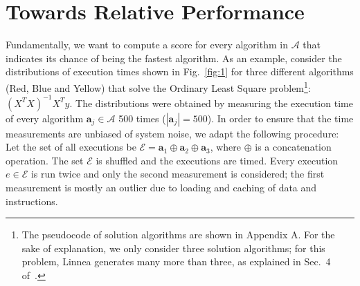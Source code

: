\documentclass[conference]{IEEEtran}
\newcommand{\p}[1]{{\color{blue} Pdj: #1}}
\begin{document}
\section{Towards Relative Performance}
\label{sec:torel}
Fundamentally, we want to compute a score for every algorithm in $\mathcal{A}$ that indicates its chance of being the fastest algorithm. As an example, consider the distributions of execution times shown in Fig.~\ref{fig:1} for three different algorithms (Red, Blue and
Yellow) that solve the Ordinary Least Square problem\footnote{The pseudocode of solution algorithms are shown in Appendix A. For the sake of
  explanation, we only consider three solution algorithms; for this problem, Linnea generates many more than three,
  as explained in Sec.~4 of~\cite{barthels2019linnea}.}: $(X^TX)^{-1}X^{T}y$. 
The distributions were obtained by measuring the execution time of every algorithm $\mathbf{a}_j \in \mathcal{A}$ 500 times ($|\mathbf{a}_j| = 500$).
In order to ensure that the time measurements are unbiased of system noise, we adapt the following procedure: Let the set of all executions be $\mathcal{E} = \mathbf{a}_1 \oplus \mathbf{a}_2 \oplus \mathbf{a}_3$, where $\oplus$
is a concatenation operation. The set $\mathcal{E}$ is shuffled and the executions are timed. Every execution $e \in
\mathcal{E}$ is run twice and only the second measurement is considered; the first measurement is mostly an outlier due
to loading and caching of data and instructions\cite{peise2019elaps}. 
\end{document}
